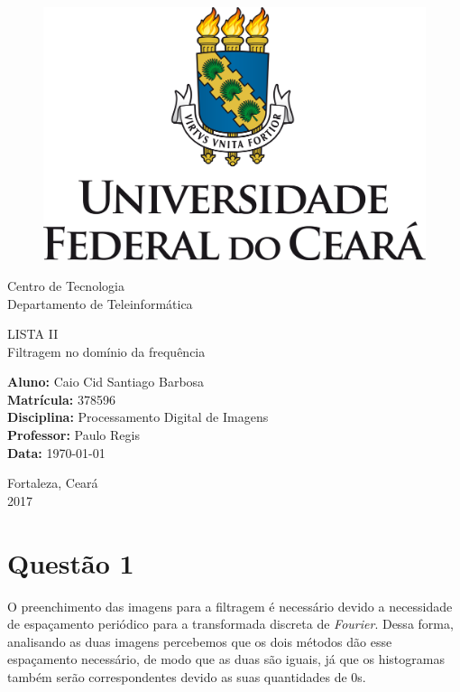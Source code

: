 \documentclass[a4paper,11pt]{article}
\begin{document}
	\begin{titlepage}
		\begin{center}
			\begin{figure}
				\centering
				\includegraphics[scale=0.4]{fig/UFCLOGO.png}
			\end{figure}
			\Huge{Centro de Tecnologia}\\
			\Huge{Departamento de Teleinformática}
		\end{center}
		\vspace{2cm}
		\begin{center}
			\Huge{LISTA II}\\
			\Huge{Filtragem no domínio da frequência}
		\end{center} 
		\vspace{2cm}
		\noindent\textbf{Aluno:} Caio Cid Santiago Barbosa \\
		\textbf{Matrícula:} 378596\\
		\textbf{Disciplina:} Processamento Digital de Imagens \\
		\textbf{Professor:} Paulo Regis \\
		\textbf{Data:} \today
		\vfill
		\begin{center}
			Fortaleza, Ceará \\
			2017
		\end{center}
	\end{titlepage}

	\section*{Questão 1}
	
	\qquad O preenchimento das imagens para a filtragem é necessário devido a necessidade de espaçamento periódico para a transformada discreta de \textit{Fourier}. Dessa forma, analisando as duas imagens percebemos que os dois métodos dão esse espaçamento necessário, de modo que as duas são iguais, já que os histogramas também serão correspondentes devido as suas quantidades de 0s.\\
	
\end{document}
